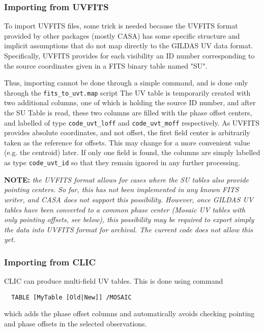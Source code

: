 \documentclass[11pt]{article}
\begin{document}
\subsubsection{Importing from UVFITS}

To import UVFITS files, some trick is needed because the UVFITS format 
provided by other packages (mostly CASA) has some specific structure 
and implicit assumptions that do not map directly to the GILDAS UV data 
format. Specifically, UVFITS provides for each visibility an ID number 
corresponding to the source coordinates given in a  FITS  binary table 
named "SU".

Thus, importing cannot be done through a simple command, and
is done only through the \texttt{fits\_to\_uvt.map} script
The UV table is temporarily created with two additional columns, one of which is holding
the source ID number, and after the SU Table is read, these two columns are filled with
the phase offset centers, and labelled of type \texttt{code\_uvt\_loff} and
\texttt{code\_uvt\_moff} respectively.
As UVFITS provides absolute coordinates, and not offset, the first field center is arbitrarily
taken as the reference for offsets. This may change for a more convenient value
(e.g. the centroid) later. If only one field is found, the columns are simply labelled
as type \texttt{code\_uvt\_id} so that they remain ignored in any further processing.

\textbf{NOTE: }\textit{the UVFITS format allows for cases where the SU tables also
provide pointing centers. So far, this has not been implemented in any known FITS writer,
and CASA does not support this possibility. However, once GILDAS UV tables have been
converted to a common phase center (Mosaic UV tables with only pointing offsets, see
below), this possibility may be required to export simply the data into UVFITS format for
archival. The current code does not allow this yet.}


\subsubsection{Importing from CLIC}

CLIC can produce multi-field UV tables. This is done using command
\begin{verbatim}
  TABLE [MyTable [Old|New]] /MOSAIC
\end{verbatim}
which adds the phase offset columns and automatically avoids checking
pointing and phase offsets in the selected observations.
\end{document}
